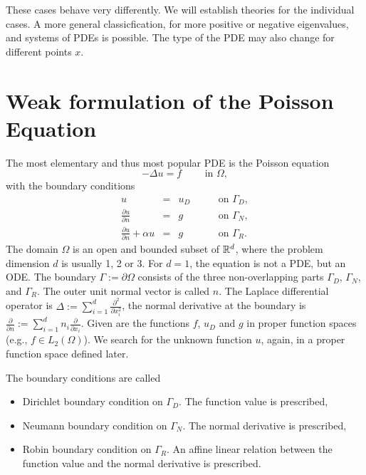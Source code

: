 %
These cases behave very differently. We will establish theories for
the individual cases.  A more general classicfication, for more
positive or negative eigenvalues, and systems of PDEs is possible. The
type of the PDE may also change for different points $x$.






\section{Weak formulation of the Poisson Equation}
\label{sec_intro}
The most elementary and thus most popular PDE is the Poisson equation
\begin{equation}
\label{equ_laplace}
-\Delta u = f \qquad \mbox{ in } \Omega,
\end{equation}
with the boundary conditions
\begin{equation}
\label{equ_laplace_bc}
\begin{array}{rcll}
u & = & u_D \qquad & \mbox{on } \Gamma_D, \\
\frac{\partial u}{\partial n} & = & g \qquad & \mbox{on } \Gamma_N, \\
\frac{\partial u}{\partial n} + \alpha u & = & g \qquad & \mbox{on } \Gamma_R.
\end{array}
\end{equation}
%
The domain $\Omega$ is an open and bounded subset of ${\mathbb R}^d$, where
the problem dimension $d$ is usually 1, 2 or 3. For $d = 1$, the
equation is not a PDE, but an ODE. The boundary $\Gamma := \partial
\Omega$ consists of the three non-overlapping parts $\Gamma_D$,
$\Gamma_N$, and $\Gamma_R$. The outer
unit normal vector is called $n$. The Laplace differential operator is
$\Delta := \sum_{i=1}^d
\frac{\partial^2}{\partial x_i^2}$, the normal derivative at the
boundary is $\frac{\partial}{\partial n} := \sum_{i=1}^d n_i
\frac{\partial}{\partial x_i}$. Given are the functions $f$, $u_D$ and
$g$ in proper function spaces (e.g., $f \in L_2(\Omega)$). We search for
the unknown function $u$, again, in a proper function space defined later. 

The boundary conditions are called
\begin{itemize}
\item 
Dirichlet boundary condition on $\Gamma_D$. The function value is prescribed,
\item
Neumann boundary condition on $\Gamma_N$. The normal derivative is prescribed,
\item
Robin boundary condition on $\Gamma_R$. An affine linear relation between
the function value and the normal derivative is prescribed.
\end{itemize}

